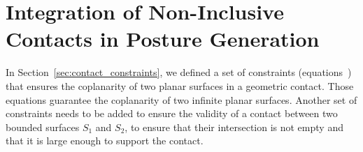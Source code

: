 \section{Integration of Non-Inclusive Contacts in Posture Generation}
\label{sec:integration_on_non_inclusive_contacts_in_posture generation}


In Section~\ref{sec:contact_constraints}, we defined a set of constraints (equations~) that ensures the coplanarity of two planar surfaces in a geometric contact.
Those equations guarantee the coplanarity of two infinite planar surfaces.
Another set of constraints needs to be added to ensure the validity of a contact between two bounded surfaces $S_1$ and $S_2$, to ensure that their intersection is not empty and that it is large enough to support the contact.

